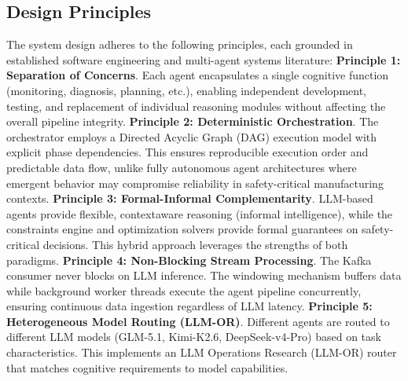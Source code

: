 \subsection{Design Principles}
The system design adheres to the following principles, each grounded in established software
engineering and multi-agent systems literature:
\textbf{Principle 1: Separation of Concerns}. Each agent encapsulates a single cognitive function (monitoring, diagnosis, planning, etc.), enabling independent development, testing, and replacement of individual reasoning modules without affecting the overall pipeline integrity.
\textbf{Principle 2: Deterministic Orchestration}. The orchestrator employs a Directed Acyclic Graph (DAG) execution model with explicit phase dependencies. This ensures
reproducible execution order and predictable data flow, unlike fully autonomous agent
architectures where emergent behavior may compromise reliability in safety-critical
manufacturing contexts.
\textbf{Principle 3: Formal-Informal Complementarity}. LLM-based agents provide flexible, contextaware reasoning (informal intelligence), while the constraints engine and  optimization solvers provide formal guarantees on safety-critical decisions. This hybrid approach leverages the strengths of both paradigms.
\textbf{Principle 4: Non-Blocking Stream Processing}. The Kafka consumer never blocks on LLM
inference. The windowing mechanism buffers data while background worker threads execute the
agent pipeline concurrently, ensuring continuous data ingestion regardless of LLM latency.
\textbf{Principle 5: Heterogeneous Model Routing (LLM-OR)}. Different agents are routed to different LLM models (GLM-5.1, Kimi-K2.6, DeepSeek-v4-Pro) based on task characteristics. This implements an LLM Operations Research (LLM-OR) router that matches cognitive requirements to model capabilities.

